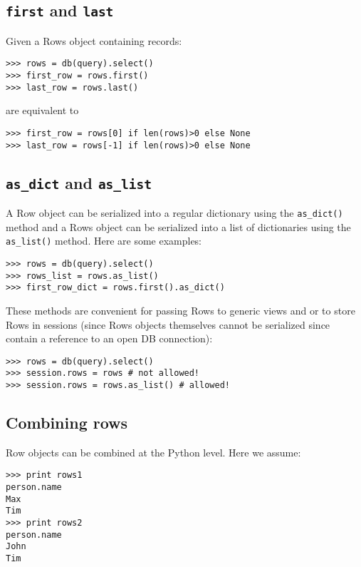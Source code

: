 \documentclass[justified,sixbynine,notoc]{tufte-book}
\def\ft{\small\tt}
\def\inxx#1{\index{#1}}
\begin{document}
\begin{fullwidth}
\goodbreak\subsection{{\ft first} and {\ft last}}

\inxx{first} \inxx{last}

Given a Rows object containing records:

\begin{lstlisting}
>>> rows = db(query).select()
>>> first_row = rows.first()
>>> last_row = rows.last()
\end{lstlisting}
\noindent are equivalent to
\begin{lstlisting}
>>> first_row = rows[0] if len(rows)>0 else None
>>> last_row = rows[-1] if len(rows)>0 else None
\end{lstlisting}

\goodbreak\subsection{{\ft as\_dict} and {\ft as\_list}}

\inxx{as\_list} \inxx{as\_dict}

A Row object can be serialized into a regular dictionary using the {\ft as\_dict()} method and a Rows object can be serialized into a list of dictionaries using the {\ft as\_list()} method. Here are some examples:
\begin{lstlisting}
>>> rows = db(query).select()
>>> rows_list = rows.as_list()
>>> first_row_dict = rows.first().as_dict()
\end{lstlisting}

These methods are convenient for passing Rows to generic views and or to store Rows in sessions (since Rows objects themselves cannot be serialized since contain a reference to an open DB connection):
\begin{lstlisting}
>>> rows = db(query).select()
>>> session.rows = rows # not allowed!
>>> session.rows = rows.as_list() # allowed!
\end{lstlisting}

\goodbreak\subsection{Combining rows}

Row objects can be combined at the Python level. Here we assume:

\begin{lstlisting}
>>> print rows1
person.name
Max
Tim
>>> print rows2
person.name
John
Tim
\end{lstlisting}


\end{fullwidth}
\end{document}
